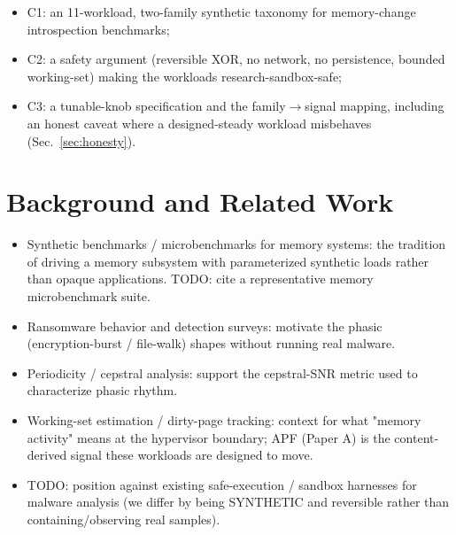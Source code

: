 \documentclass[conference]{IEEEtran}
\begin{document}
\begin{itemize}
    \begin{itemize}
      \item C1: an 11-workload, two-family synthetic taxonomy for memory-change
            introspection benchmarks;
      \item C2: a safety argument (reversible XOR, no network, no persistence,
            bounded working-set) making the workloads research-sandbox-safe;
      \item C3: a tunable-knob specification and the family$\to$signal mapping,
            including an honest caveat where a designed-steady workload
            misbehaves (Sec.~\ref{sec:honesty}).
    \end{itemize}
\end{itemize}

\section{Background and Related Work}
\begin{itemize}
  \item Synthetic benchmarks / microbenchmarks for memory systems: the tradition
        of driving a memory subsystem with parameterized synthetic loads rather
        than opaque applications. TODO: cite a representative memory
        microbenchmark suite. \cite{TODO_working_set_estimation}
  \item Ransomware behavior and detection surveys: motivate the phasic
        (encryption-burst / file-walk) shapes without running real malware.
        \cite{TODO_ransomware_survey}
  \item Periodicity / cepstral analysis: support the cepstral-SNR metric used to
        characterize phasic rhythm. \cite{TODO_cepstrum}
  \item Working-set estimation / dirty-page tracking: context for what "memory
        activity" means at the hypervisor boundary; APF (Paper A) is the
        content-derived signal these workloads are designed to move.
        \cite{TODO_working_set_estimation}
  \item TODO: position against existing safe-execution / sandbox harnesses for
        malware analysis (we differ by being SYNTHETIC and reversible rather
        than containing/observing real samples).
\end{itemize}
\end{document}
